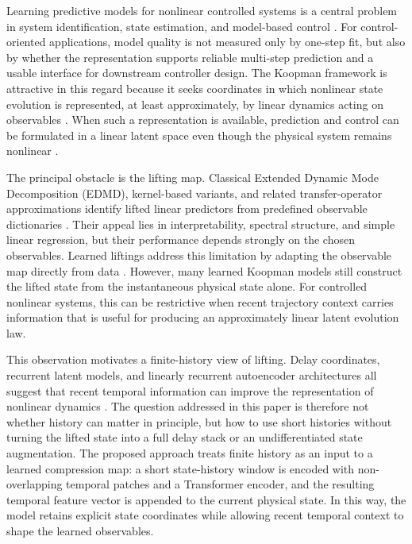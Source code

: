 \documentclass[journal]{IEEEtran}
\begin{document}
Learning predictive models for nonlinear controlled systems is a central problem in system identification, state estimation, and model-based control \cite{ljung1999system, vanoverschee1994n4sid, nelles2020nonlinear}. For control-oriented applications, model quality is not measured only by one-step fit, but also by whether the representation supports reliable multi-step prediction and a usable interface for downstream controller design. The Koopman framework is attractive in this regard because it seeks coordinates in which nonlinear state evolution is represented, at least approximately, by linear dynamics acting on observables \cite{koopman1931hamiltonian, koopman1932spectra, mezic2005spectral, rowley2009spectral, brunton2022modern}. When such a representation is available, prediction and control can be formulated in a linear latent space even though the physical system remains nonlinear \cite{otto2021koopman, proctor2018generalizing, korda2018linear}.

The principal obstacle is the lifting map. Classical Extended Dynamic Mode Decomposition (EDMD), kernel-based variants, and related transfer-operator approximations identify lifted linear predictors from predefined observable dictionaries \cite{williams2015data, williams2015kernel, klus2018data}. Their appeal lies in interpretability, spectral structure, and simple linear regression, but their performance depends strongly on the chosen observables. Learned liftings address this limitation by adapting the observable map directly from data \cite{takeishi2017koopman, yeung2019learning, lusch2018deep, morton2019deep, azencot2020forecasting}. However, many learned Koopman models still construct the lifted state from the instantaneous physical state alone. For controlled nonlinear systems, this can be restrictive when recent trajectory context carries information that is useful for producing an approximately linear latent evolution law.

This observation motivates a finite-history view of lifting. Delay coordinates, recurrent latent models, and linearly recurrent autoencoder architectures all suggest that recent temporal information can improve the representation of nonlinear dynamics \cite{arbabi2017ergodic, rank2019recurrent, otto2019linearly, forgione2021dynonet}. The question addressed in this paper is therefore not whether history can matter in principle, but how to use short histories without turning the lifted state into a full delay stack or an undifferentiated state augmentation. The proposed approach treats finite history as an input to a learned compression map: a short state-history window is encoded with non-overlapping temporal patches and a Transformer encoder, and the resulting temporal feature vector is appended to the current physical state. In this way, the model retains explicit state coordinates while allowing recent temporal context to shape the learned observables.
\end{document}
